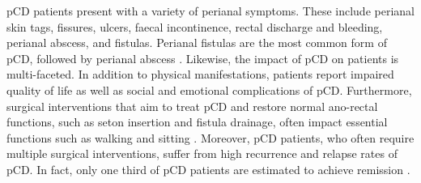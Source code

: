pCD patients present with a variety of perianal symptoms. These include perianal skin tags, fissures, ulcers, faecal incontinence, rectal discharge and bleeding, perianal abscess, and fistulas. Perianal fistulas are the most common form of pCD, followed by perianal abscess \cite{Eglinton2012-vx}. Likewise, the impact of pCD on patients is multi-faceted. In addition to physical manifestations, patients report impaired quality of life as well as social and emotional complications of pCD. Furthermore, surgical interventions that aim to treat pCD and restore normal ano-rectal functions, such as seton insertion and fistula drainage, often impact essential functions such as walking and sitting \cite{Adegbola2020-nd}. Moreover, pCD patients, who often require multiple surgical interventions, suffer from high recurrence and relapse rates of pCD. In fact, only one third of pCD patients are estimated to achieve remission \cite{Panes2018-su,Braithwaite2017-zo}. \\


